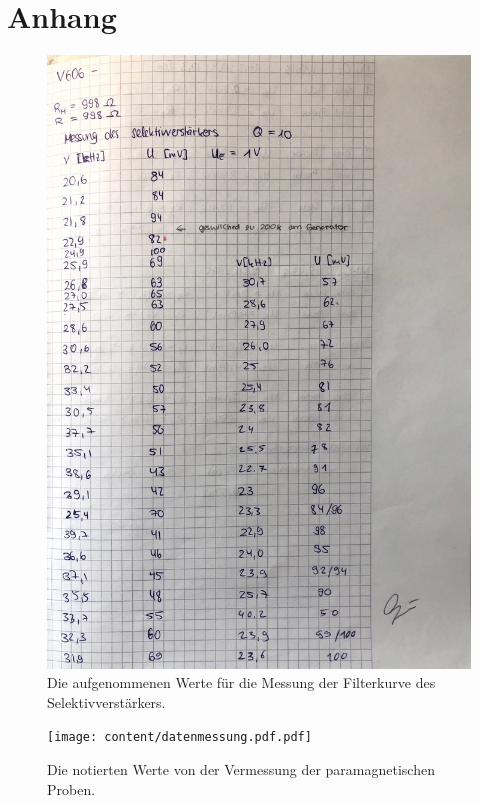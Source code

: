 \section{Anhang}
\label{sec:Anhang}
\begin{figure}
    \centering
    \includegraphics[width=\textwidth]{content/datenselektiv.pdf}
    \caption{Die aufgenommenen Werte für die Messung der Filterkurve des Selektivverstärkers.}
    \label{fig:datenselektiv}
\end{figure}
\begin{figure}
    \centering
    \texttt{[image: content/datenmessung.pdf.pdf]}
    \caption{Die notierten Werte von der Vermessung der paramagnetischen Proben.}
    \label{fig:datenmessung}
\end{figure}
